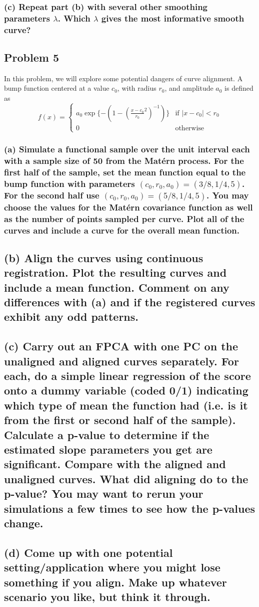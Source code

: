 \documentclass{article}
\begin{document}
\subsubsection*{(c) Repeat part (b) with several other smoothing parameters $\lambda$. Which $\lambda$ gives the most informative smooth curve?}



\newpage
\subsection{Problem 5}
In this problem, we will explore some potential dangers of curve alignment. 
A bump function centered at a value $c_0$, with radius $r_0$, and amplitude $a_0$ is defined as 
\begin{equation*}
    f(x) = \begin{cases}
        a_0\exp{\{-(1-(\frac{x-c_0}{r_0}^2)^{-1})\}} &\text{if } |x-c_0|<r_0 \\
        0 &\text{otherwise}
    \end{cases}
\end{equation*}
\subsubsection*{(a) Simulate a functional sample over the unit interval each with a sample size of 50 from the Mat\'{e}rn process. 
For the first half of the sample, set the mean function equal to the bump function with parameters $(c_0,r_0,a_0)=(3/8,1/4,5)$.
For the second half use $(c_0,r_0,a_0)=(5/8,1/4,5)$.
You may choose the values for the Mat\'{e}rn covariance function as well as the number of points sampled per curve.
Plot all of the curves and include a curve for the overall mean function.}
\subsection*{(b) Align the curves using continuous registration. Plot the resulting curves and include a mean function. Comment on any differences with (a) and if the registered curves exhibit any odd patterns.}
\subsection*{(c) Carry out an FPCA with one PC on the unaligned and aligned curves separately. 
For each, do a simple linear regression of the score onto a dummy variable (coded 0/1) 
indicating which type of mean the function had (i.e. is it from the first or second half of the sample). 
Calculate a p-value to determine if the estimated slope parameters you get are significant. 
Compare with the aligned and unaligned curves. What did aligning do to the p-value? 
You may want to rerun your simulations a few times to see how the p-values change.}
\subsection*{(d) Come up with one potential setting/application 
where you might lose something if you align. Make up whatever scenario you like, but think it through.}
\end{document}
